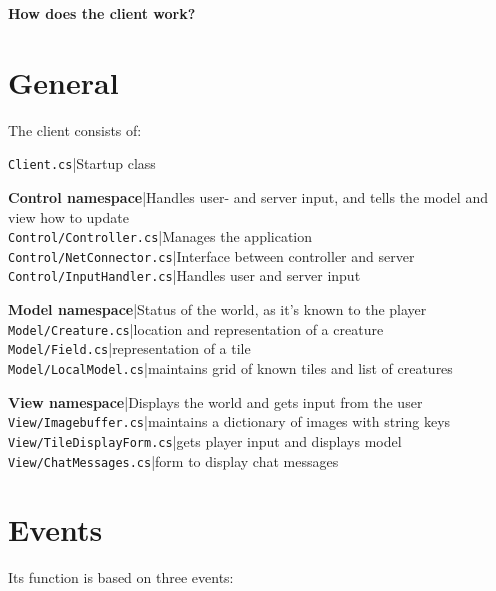 \documentclass{article}
\begin{document}
	\textbf{\Large{How does the client work?}}
	
	\section{General}
		The client consists of:
				
		\texttt{Client.cs}|Startup class
		
		\vspace{3 mm}
		
		\textbf{Control namespace}|Handles user- and server input, and tells the model and view how to update\\
		\texttt{Control/Controller.cs}|Manages the application\\
		\texttt{Control/NetConnector.cs}|Interface between controller and server\\
		\texttt{Control/InputHandler.cs}|Handles user and server input
		
		\vspace{3 mm}
		
		\textbf{Model namespace}|Status of the world, as it's known to the player\\
		\texttt{Model/Creature.cs}|location and representation of a creature\\
		\texttt{Model/Field.cs}|representation of a tile\\
		\texttt{Model/LocalModel.cs}|maintains grid of known tiles and list of creatures
		
		\vspace{3 mm}
		
		\textbf{View namespace}|Displays the world and gets input from the user\\
		\texttt{View/Imagebuffer.cs}|maintains a dictionary of images with string keys\\
		\texttt{View/TileDisplayForm.cs}|gets player input and displays model\\
		\texttt{View/ChatMessages.cs}|form to display chat messages
		
	\section{Events}
		Its function is based on three events:
		
\end{document}
